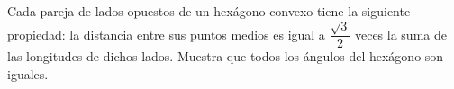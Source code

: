 Cada pareja de lados opuestos de un hexágono convexo tiene la siguiente propiedad: la distancia entre sus puntos medios es igual a $\dfrac{\sqrt{3}}{2}$ veces la suma de las longitudes de dichos lados. Muestra que todos los ángulos del hexágono son iguales.